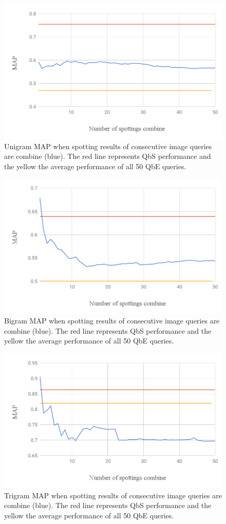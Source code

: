 \documentclass[ms,electronic,twosidetoc,letterpaper,chaptercenter,parttop,lof,lot]{byumsphd}
\begin{document}
\begin{figure}
    \centering
    \includegraphics[width=.75\textwidth]{unigram_respot_chart}
    \caption{Unigram MAP when spotting results of consecutive image queries are combine (blue). The red line represents QbS performance and the yellow the average performance of all 50 QbE queries.}
    \label{fig:unigram_respot}
\end{figure}
\begin{figure}
    \centering
    \includegraphics[width=.75\textwidth]{bigram_respot_chart}
    \caption{Bigram MAP when spotting results of consecutive image queries are combine (blue). The red line represents QbS performance and the yellow the average performance of all 50 QbE queries.}
    \label{fig:bigram_respot}
\end{figure}
\begin{figure}
    \centering
    \includegraphics[width=.75\textwidth]{trigram_respot_chart}
    \caption{Trigram MAP when spotting results of consecutive image queries are combine (blue). The red line represents QbS performance and the yellow the average performance of all 50 QbE queries.}
    \label{fig:trigram_respot}
\end{figure}
\end{document}
